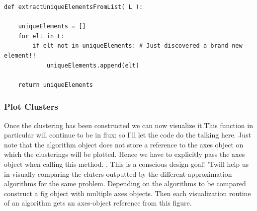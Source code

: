 \documentclass[11pt]{article}
\begin{document}
\begin{verbatim}
def extractUniqueElementsFromList( L ):

    uniqueElements = []
    for elt in L:
        if elt not in uniqueElements: # Just discovered a brand new element!!
            uniqueElements.append(elt)

    return uniqueElements
\end{verbatim}



\subsubsection{Plot Clusters}
\label{sec-3-2-3}

Once the clustering has been constructed we can now visualize it.This function in particular will continue to be in flux: 
so I'll let the code do the talking here. Just note that the algorithm object does not store a reference to the axes object 
on which the clusterings will be plotted. Hence we have to explicitly pass the axes object when calling this method. 
.   This is a conscious design goal!  'Twill help us in visually comparing the 
cluters outputted by the different approximation algorithms for the same problem. Depending on the algorithms to be compared 
construct a fig object with multiple axes objects. Then each visualization routine of an algorithm gets an axes-object 
reference from this figure. 
\end{document}
